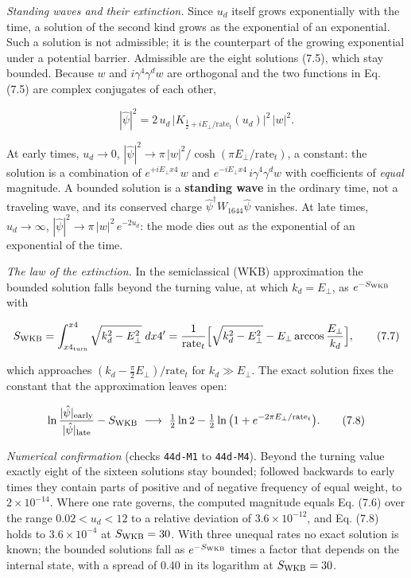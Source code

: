 \documentclass[
  10pt,
]{article}
\begin{document}
\emph{Standing waves and their extinction.} Since \(u_d\) itself grows
exponentially with the time, a solution of the second kind grows as the
exponential of an exponential. Such a solution is not admissible; it is
the counterpart of the growing exponential under a potential barrier.
Admissible are the eight solutions (7.5), which stay bounded. Because
\(w\) and \(i\gamma^4\gamma^dw\) are orthogonal and the two functions in
Eq. (7.5) are complex conjugates of each other,

\[|\hat\psi|^2=2\,u_d\,\big|K_{\frac12+iE_\perp/\mathrm{rate}_t}(u_d)\big|^2\,|w|^2.\tag{7.6}\]

At early times, \(u_d\to0\),
\(|\hat\psi|^2\to\pi\,|w|^2/\cosh(\pi E_\perp/\mathrm{rate}_t)\), a
constant: the solution is a combination of \(e^{+iE_\perp x4}\,w\) and
\(e^{-iE_\perp x4}\,i\gamma^4\gamma^dw\) with coefficients of
\emph{equal} magnitude. A bounded solution is a \textbf{standing wave}
in the ordinary time, not a traveling wave, and its conserved charge
\(\hat\psi^\dagger W_{1644}\hat\psi\) vanishes. At late times,
\(u_d\to\infty\), \(|\hat\psi|^2\to\pi\,|w|^2\,e^{-2u_d}\): the mode
dies out as the exponential of an exponential of the time.

\emph{The law of the extinction.} In the semiclassical (WKB)
approximation the bounded solution falls beyond the turning value, at
which \(k_d=E_\perp\), as \(e^{-S_{\rm WKB}}\) with

\[S_{\rm WKB}=\int_{x4_{\rm turn}}^{x4}\sqrt{k_d^2-E_\perp^2}\;dx4'
=\frac{1}{\mathrm{rate}_t}\Big[\sqrt{k_d^2-E_\perp^2}-E_\perp\arccos\frac{E_\perp}{k_d}\Big],\tag{7.7}\]

which approaches \((k_d-\tfrac{\pi}{2}E_\perp)/\mathrm{rate}_t\) for
\(k_d\gg E_\perp\). The exact solution fixes the constant that the
approximation leaves open:

\[\ln\frac{|\hat\psi|_{\rm early}}{|\hat\psi|_{\rm late}}-S_{\rm WKB}\ \longrightarrow\
\tfrac12\ln2-\tfrac12\ln\big(1+e^{-2\pi E_\perp/\mathrm{rate}_t}\big).\tag{7.8}\]

\emph{Numerical confirmation} (checks \texttt{44d-M1} to
\texttt{44d-M4}). Beyond the turning value exactly eight of the sixteen
solutions stay bounded; followed backwards to early times they contain
parts of positive and of negative frequency of equal weight, to
\(2\times10^{-14}\). Where one rate governs, the computed magnitude
equals Eq. (7.6) over the range \(0.02<u_d<12\) to a relative deviation
of \(3.6\times10^{-12}\), and Eq. (7.8) holds to \(3.6\times10^{-4}\) at
\(S_{\rm WKB}=30\). With three unequal rates no exact solution is known;
the bounded solutions fall as \(e^{-S_{\rm WKB}}\) times a factor that
depends on the internal state, with a spread of 0.40 in its logarithm at
\(S_{\rm WKB}=30\).
\end{document}
